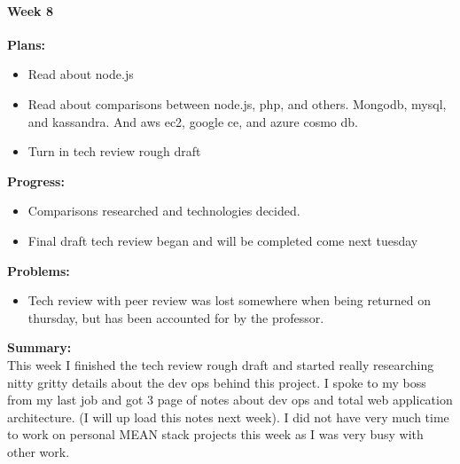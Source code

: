 \paragraph{Week 8}
\begin{adjustwidth}{2.5em}{0pt}
    \vspace{-0.5cm}\textbf{Plans:}
    \vspace{-0.5cm}
    \begin{itemize}
        \item Read about node.js
        \item Read about comparisons between node.js, php, and others. Mongodb, mysql, and kassandra. And aws ec2, google ce, and azure cosmo db.
        \item Turn in tech review rough draft 
    \end{itemize} 
    \vspace{-0.3cm}\textbf{Progress:}
    \vspace{-0.5cm}
    \begin{itemize}
        \item Comparisons researched and technologies decided.
        \item Final draft tech review began and will be completed come next tuesday
    \end{itemize} 
    \vspace{-0.3cm}\textbf{Problems:}
    \vspace{-0.5cm}
    \begin{itemize}
        \item Tech review with peer review was lost somewhere when being returned on thursday, but has been accounted for by the professor.
    \end{itemize}  
    \vspace{-0.3cm}\noindent\textbf{Summary:}\\
    \noindent This week I finished the tech review rough draft and started really researching nitty gritty details about the dev ops behind this project. I spoke to my boss from my last job and got 3 page of notes about dev ops and total web application architecture. (I will up load this notes next week). I did not have very much time to work on personal MEAN stack projects this week as I was very busy with other work.
\end{adjustwidth} 
